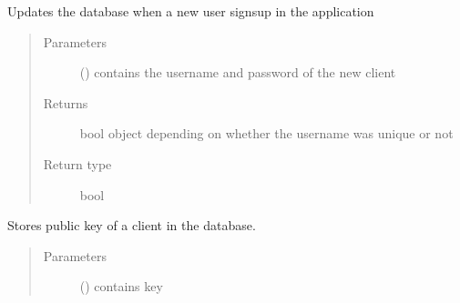 \documentclass[letterpaper,10pt,english]{sphinxmanual}
\begin{document}

\begin{fulllineitems}
\label{\detokenize{server:server.signuppage}}
Updates the database when a new user signsup in the application
\begin{quote}\begin{description}
\item[{Parameters}] \leavevmode
{} () \textendash{} contains the username and password of the new client

\item[{Returns}] \leavevmode
bool object depending on whether the username was unique or not

\item[{Return type}] \leavevmode
bool

\end{description}\end{quote}

\end{fulllineitems}


\begin{fulllineitems}
\label{\detokenize{server:server.store_key}}
Stores public key of a client in the database.
\begin{quote}\begin{description}
\item[{Parameters}] \leavevmode
{} () \textendash{} contains key

\end{description}\end{quote}

\end{fulllineitems}

\end{document}
